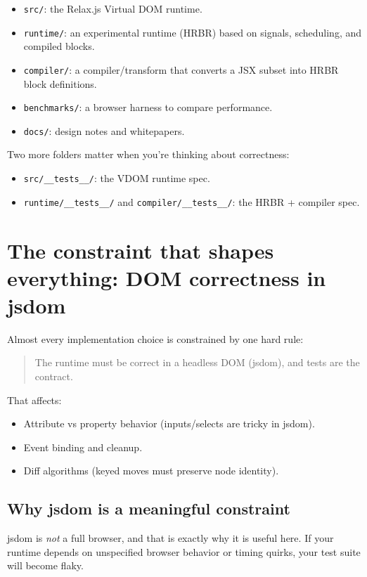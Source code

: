 \begin{itemize}
  \item \texttt{src/}: the Relax.js Virtual DOM runtime.
  \item \texttt{runtime/}: an experimental runtime (HRBR) based on signals, scheduling, and compiled blocks.
  \item \texttt{compiler/}: a compiler/transform that converts a JSX subset into HRBR block definitions.
  \item \texttt{benchmarks/}: a browser harness to compare performance.
  \item \texttt{docs/}: design notes and whitepapers.
\end{itemize}

Two more folders matter when you're thinking about correctness:

\begin{itemize}
  \item \texttt{src/\_\_tests\_\_/}: the VDOM runtime spec.
  \item \texttt{runtime/\_\_tests\_\_/} and \texttt{compiler/\_\_tests\_\_/}: the HRBR + compiler spec.
\end{itemize}

\section{The constraint that shapes everything: DOM correctness in jsdom}
Almost every implementation choice is constrained by one hard rule:

\begin{quote}
The runtime must be correct in a headless DOM (jsdom), and tests are the contract.
\end{quote}

That affects:

\begin{itemize}
  \item Attribute vs property behavior (inputs/selects are tricky in jsdom).
  \item Event binding and cleanup.
  \item Diff algorithms (keyed moves must preserve node identity).
\end{itemize}

\subsection{Why jsdom is a meaningful constraint}
jsdom is \emph{not} a full browser, and that is exactly why it is useful here.
If your runtime depends on unspecified browser behavior or timing quirks, your test suite will become flaky.

